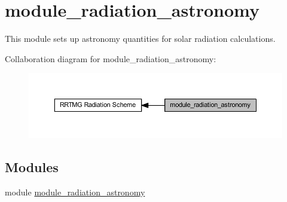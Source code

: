 \hypertarget{group__module__radiation__astronomy}{}\section{module\+\_\+radiation\+\_\+astronomy}
\label{group__module__radiation__astronomy}


This module sets up astronomy quantities for solar radiation calculations.  


Collaboration diagram for module\+\_\+radiation\+\_\+astronomy\+:\nopagebreak
\begin{figure}[H]
\begin{center}
\leavevmode
\includegraphics[width=350pt]{group__module__radiation__astronomy}
\end{center}
\end{figure}
\subsection*{Modules}
\begin{DoxyCompactItemize}
\item 
module \hyperlink{namespacemodule__radiation__astronomy}{module\+\_\+radiation\+\_\+astronomy}
\end{DoxyCompactItemize}
